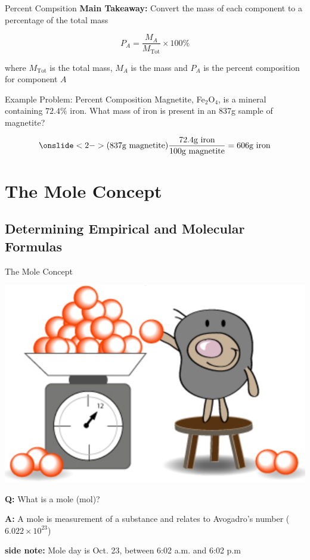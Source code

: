 \documentclass[11pt]{beamer}
\begin{document}
\begin{frame}{Percent Compsition}
  \textbf{Main Takeaway:} Convert the mass of each component
  to a percentage of the total mass

  \begin{equation}
    P_A = \frac{M_A}{M_\text{Tot}} \times 100\%
  \end{equation}

  where $M_\text{Tot}$ is the total mass, $M_A$ is the mass and $P_A$
  is the percent composition for component $A$
\end{frame}

\begin{frame}{Example Problem: Percent Composition}
  Magnetite, Fe$_2$O$_4$, is a mineral containing $72.4\%$ iron. What
  mass of iron is present in an 837g sample of magnetite?

  \begin{align*}
   \onslide<2->{ (837 \text{g magnetite})\frac{72.4 \text{g iron}}{100 \text{g magnetite}}
    = 606 \text{g iron}}
  \end{align*}
  
\end{frame}

\section{The Mole Concept}

\subsection{Determining Empirical and Molecular Formulas}

\begin{frame}{The Mole Concept}
  \begin{center}
    \includegraphics[scale=0.2]{mole}
  \end{center}
  
  \textbf{Q:} What is a mole (mol)?

  \textbf{A:} A mole is measurement of a substance and relates to
  Avogadro's number ($6.022 \times 10^{23}$)

  \textbf{side note:} Mole day is Oct. 23, between 6:02 a.m. and 6:02 p.m
\end{frame}
\end{document}
